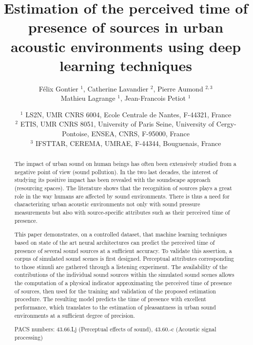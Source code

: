 \documentclass[twocolumn]{article}
\begin{document}
\author{F\'elix Gontier $^1$, Catherine Lavandier $^2$, Pierre Aumond $^{2, 3}$\\Mathieu Lagrange $^1$, Jean-Francois Petiot $^1$}
\date{
$^1$ LS2N, UMR CNRS 6004, Ecole Centrale de Nantes, F-44321, France\\
$^2$ ETIS, UMR CNRS 8051, University of Paris Seine, University of Cergy-Pontoise, ENSEA, CNRS, F-95000, France\\
$^3$ IFSTTAR, CEREMA, UMRAE, F-44344, Bouguenais, France
}
\title{Estimation of the perceived time of presence of sources in urban acoustic environments using deep learning techniques}
\maketitle


\begin{abstract}

The impact of urban sound on human beings has often been extensively studied from a negative point of view (sound pollution). In the two last decades, the interest of studying its positive impact has been revealed with the soundscape approach (resourcing spaces). The literature shows that the recognition of sources plays a great role in the way humans are affected by sound environments. There is thus a need for characterizing urban acoustic environments not only with sound pressure measurements but also with source-specific attributes such as their perceived time of presence.

This paper demonstrates, on a controlled dataset, that machine learning techniques based on state of the art neural architectures can predict the perceived time of presence of several sound sources at a sufficient accuracy. To validate this assertion, a corpus of simulated sound scenes is first designed. Perceptual attributes corresponding to those stimuli are gathered through a listening experiment. The availability of the contributions of the individual sound sources within the simulated sound scenes allows the computation of a physical indicator approximating the perceived time of presence of sources, then used for the training and validation of the proposed estimation procedure. The resulting model predicts the time of presence with excellent performance, which translates to the estimation of pleasantness in urban sound environments at a sufficient degree of precision.

PACS numbers: 43.66.Lj (Perceptual effects of sound), 43.60.-c (Acoustic signal processing)
\end{abstract}
\end{document}
